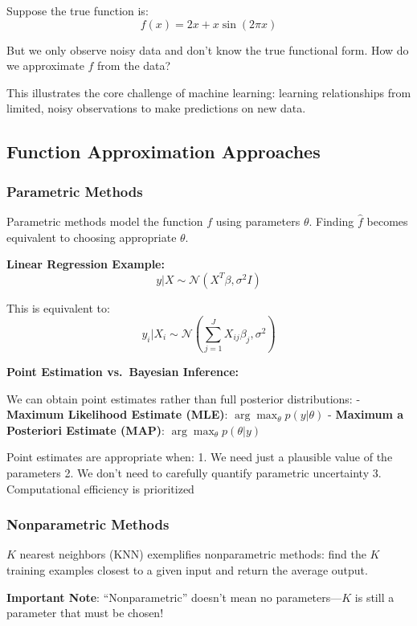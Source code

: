 \documentclass[
  letterpaper,
  DIV=11,
  numbers=noendperiod]{scrreprt}
\begin{document}
Suppose the true function is: \[
f(x) = 2x + x \sin(2 \pi x)
\]

But we only observe noisy data and don't know the true functional form.
How do we approximate \(f\) from the data?

This illustrates the core challenge of machine learning: learning
relationships from limited, noisy observations to make predictions on
new data.

\subsection{Function Approximation
Approaches}\label{function-approximation-approaches}

\subsubsection{Parametric Methods}\label{parametric-methods}

Parametric methods model the function \(f\) using parameters \(\theta\).
Finding \(\hat{f}\) becomes equivalent to choosing appropriate
\(\theta\).

\textbf{Linear Regression Example:} \[
y | X \sim \mathcal{N}(X^T \beta, \sigma^2 I)
\]

This is equivalent to: \[
y_i | X_i \sim \mathcal{N} \left(\sum_{j=1}^J X_{ij} \beta_j, \sigma^2 \right)
\]

\textbf{Point Estimation vs.~Bayesian Inference:}

We can obtain point estimates rather than full posterior distributions:
- \textbf{Maximum Likelihood Estimate (MLE)}:
\(\arg \max_\theta p(y | \theta)\) - \textbf{Maximum a Posteriori
Estimate (MAP)}: \(\arg \max_\theta p(\theta | y)\)

Point estimates are appropriate when: 1. We need just a plausible value
of the parameters 2. We don't need to carefully quantify parametric
uncertainty 3. Computational efficiency is prioritized

\subsubsection{Nonparametric Methods}\label{nonparametric-methods}

\(K\) nearest neighbors (KNN) exemplifies nonparametric methods: find
the \(K\) training examples closest to a given input and return the
average output.

\textbf{Important Note}: ``Nonparametric'' doesn't mean no
parameters---\(K\) is still a parameter that must be chosen!
\end{document}
